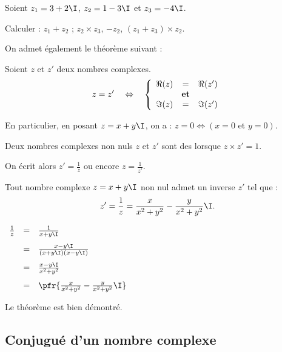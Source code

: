 \documentclass[10pt,openright,twoside,french]{book}
\begin{document}
\begin{Exemple}[s]
    Soient $z_1 = 3 + 2\I$, $z_2 = 1 - 3\I$ et $z_3 = -4\I$.\par
    Calculer : $z_1 + z_2$ ; $z_2 \times z_3$, $-z_2$, $(z_1 + z_3) \times z_2$.
\end{Exemple}\medskip

On admet également le théorème suivant :

\begin{Thm}
    Soient $z$ et $z'$ deux nombres complexes.
    \[z = z' \quad \Leftrightarrow \quad \left\{\begin{array}{rcl} \Re(z) & = & \Re(z') \\ & \text{\textbf{et}} & \\ \Im(z) & = & \Im(z') \end{array}\right.\]
\end{Thm}

\begin{Rmq}
    En particulier, en posant $z = x + y\I$, on a : $z = 0 \Leftrightarrow (x = 0 \text{ et } y = 0)$.
\end{Rmq}

\begin{Defi}
    Deux nombres complexes non nuls $z$ et $z'$ sont des  lorsque $z \times z' = 1$.\par
    On écrit alors $z' = \frac 1 z$ ou encore $z = \frac{1}{z'}$.
\end{Defi}

\begin{Thm}
    Tout nombre complexe $z = x + y\I$ non nul admet un inverse $z'$ tel que :
    \[z' = \frac 1 z = \frac{x}{x^2 + y^2} - \frac{y}{x^2 + y^2}\I.\]
\end{Thm}

\begin{Demo}
    $\begin{array}[t]{rcl}
        \frac 1 z & = & \frac{1}{x + y\I} \\[9pt]
                      & = & \frac{x - y\I}{(x + y\I)(x - y\I)} \\[9pt]
                      & = & \frac{x - y\I}{x^2 + y^2} \\[9pt]
                      & = & \pfr{\frac{x}{x^2 + y^2} - \frac{y}{x^2 + y^2}\I}
    \end{array}$

    Le théorème est bien démontré.
\end{Demo}

\subsection{Conjugué d'un nombre complexe}
\end{document}
